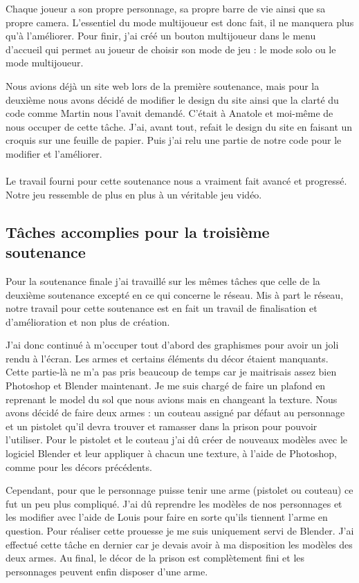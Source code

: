 \documentclass[12pt]{article}
\begin{document}
Chaque joueur a son propre personnage, sa propre barre de vie ainsi que sa propre camera. L'essentiel du mode multijoueur est donc fait, il ne manquera plus qu'à l'améliorer. Pour finir, j'ai créé un bouton multijoueur dans le menu d'accueil qui permet au joueur de choisir son mode de jeu : le mode solo ou le mode multijoueur.

Nous avions déjà un site web lors de la première soutenance, mais pour la deuxième nous avons décidé de modifier le design du site ainsi que la clarté du code comme Martin nous l'avait demandé. C'était à Anatole et moi-même de nous occuper de cette tâche. J'ai, avant tout, refait le design du site en faisant un croquis sur une feuille de papier. Puis j'ai relu une partie de notre code pour le modifier et l'améliorer.
\\
\\


Le travail fourni pour cette soutenance nous a vraiment fait avancé et progressé. Notre jeu ressemble de plus en plus à un véritable jeu vidéo.

\subsection{Tâches accomplies pour la troisième soutenance}
Pour la soutenance finale j'ai travaillé sur les mêmes tâches que celle de la deuxième soutenance excepté en ce qui concerne le réseau. Mis à part le réseau, notre travail pour cette soutenance est en fait un travail de finalisation et d'amélioration et non plus de création.

J'ai donc continué à m'occuper tout d'abord des graphismes pour avoir un joli rendu à l'écran. Les armes et certains éléments du décor étaient manquants. Cette partie-là ne m’a pas pris beaucoup de temps car je maitrisais assez bien Photoshop et Blender maintenant. Je me suis chargé de faire un plafond en reprenant le model du sol que nous avions mais en changeant la texture. Nous avons décidé de faire deux armes : un couteau assigné par défaut au personnage et un pistolet qu’il devra trouver et ramasser dans la prison pour pouvoir l’utiliser. Pour le pistolet et le couteau j’ai dû créer de nouveaux modèles avec le logiciel Blender et leur appliquer à chacun une texture, à l’aide de Photoshop, comme pour les décors précédents.

Cependant, pour que le personnage puisse tenir une arme (pistolet ou couteau) ce fut un peu plus compliqué. J’ai dû reprendre les modèles de nos personnages et les modifier avec l’aide de Louis pour faire en sorte qu’ils tiennent l’arme en question. Pour réaliser cette prouesse je me suis uniquement servi de Blender. J’ai effectué cette tâche en dernier car je devais avoir à ma disposition les modèles des deux armes. Au final, le décor de la prison est complètement fini et les personnages peuvent enfin disposer d’une arme.
\end{document}

